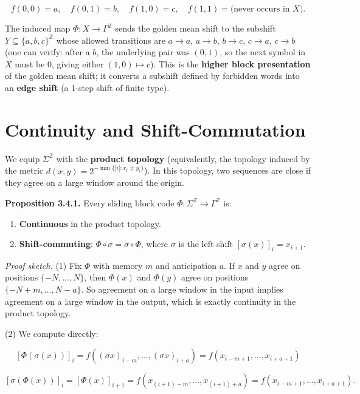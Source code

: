 \[f(0,0) = a, \quad f(0,1) = b, \quad f(1,0) = c, \quad f(1,1) = \text{(never occurs in } X\text{)}.\]

The induced map $\Phi: X \to \Gamma^\mathbb{Z}$ sends the golden mean shift to the subshift $Y \subseteq \{ a,b,c\} ^\mathbb{Z}$ whose allowed transitions are $a \to a$, $a \to b$, $b \to c$, $c \to a$, $c \to b$ (one can verify: after a $b$, the underlying pair was $(0,1)$, so the next symbol in $X$ must be $0$, giving either $(1,0) \mapsto c$). This is the \textbf{higher block presentation} of the golden mean shift; it converts a subshift defined by forbidden words into an \textbf{edge shift} (a 1-step shift of finite type).



\section{Continuity and Shift-Commutation}

We equip $\Sigma^\mathbb{Z}$ with the \textbf{product topology} (equivalently, the topology induced by the metric $d(x,y) = 2^{-\min\{ |i| : x_i \neq y_i\} }$). In this topology, two sequences are close if they agree on a large window around the origin.

\textbf{Proposition 3.4.1.} Every sliding block code $\Phi: \Sigma^\mathbb{Z} \to \Gamma^\mathbb{Z}$ is:

\begin{enumerate}
\item \textbf{Continuous} in the product topology.
\item \textbf{Shift-commuting}: $\Phi \circ \sigma = \sigma \circ \Phi$, where $\sigma$ is the left shift $[\sigma(x)]_i = x_{i+1}$.
\end{enumerate}

\textit{Proof sketch.} (1) Fix $\Phi$ with memory $m$ and anticipation $a$. If $x$ and $y$ agree on positions $\{ -N, \ldots, N\} $, then $\Phi(x)$ and $\Phi(y)$ agree on positions $\{ -N+m, \ldots, N-a\} $. So agreement on a large window in the input implies agreement on a large window in the output, which is exactly continuity in the product topology.

(2) We compute directly:

\[[\Phi(\sigma(x))]_i = f((\sigma x)_{i-m}, \ldots, (\sigma x)_{i+a}) = f(x_{i-m+1}, \ldots, x_{i+a+1})\]

\[[\sigma(\Phi(x))]_i = [\Phi(x)]_{i+1} = f(x_{(i+1)-m}, \ldots, x_{(i+1)+a}) = f(x_{i-m+1}, \ldots, x_{i+a+1}).\]

